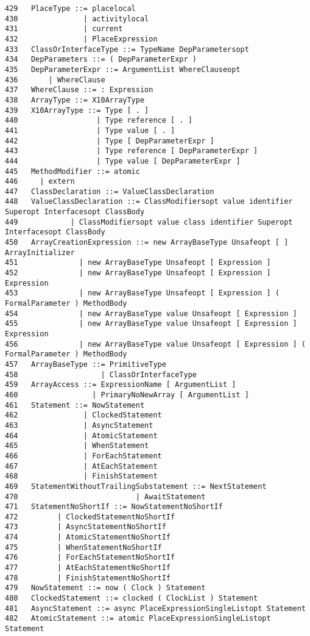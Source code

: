 {\begin{verbatim}
429   PlaceType ::= placelocal
430               | activitylocal
431               | current
432               | PlaceExpression
433   ClassOrInterfaceType ::= TypeName DepParametersopt
434   DepParameters ::= ( DepParameterExpr )
435   DepParameterExpr ::= ArgumentList WhereClauseopt
436       | WhereClause
437   WhereClause ::= : Expression
438   ArrayType ::= X10ArrayType
439   X10ArrayType ::= Type [ . ]
440                  | Type reference [ . ]
441                  | Type value [ . ]
442                  | Type [ DepParameterExpr ]
443                  | Type reference [ DepParameterExpr ]
444                  | Type value [ DepParameterExpr ]
445   MethodModifier ::= atomic
446     | extern
447   ClassDeclaration ::= ValueClassDeclaration
448   ValueClassDeclaration ::= ClassModifiersopt value identifier Superopt Interfacesopt ClassBody
449            | ClassModifiersopt value class identifier Superopt Interfacesopt ClassBody
450   ArrayCreationExpression ::= new ArrayBaseType Unsafeopt [ ] ArrayInitializer
451              | new ArrayBaseType Unsafeopt [ Expression ]
452              | new ArrayBaseType Unsafeopt [ Expression ] Expression
453              | new ArrayBaseType Unsafeopt [ Expression ] ( FormalParameter ) MethodBody
454              | new ArrayBaseType value Unsafeopt [ Expression ]
455              | new ArrayBaseType value Unsafeopt [ Expression ] Expression
456              | new ArrayBaseType value Unsafeopt [ Expression ] ( FormalParameter ) MethodBody
457   ArrayBaseType ::= PrimitiveType
458                   | ClassOrInterfaceType
459   ArrayAccess ::= ExpressionName [ ArgumentList ]
460                 | PrimaryNoNewArray [ ArgumentList ]
461   Statement ::= NowStatement
462               | ClockedStatement
463               | AsyncStatement
464               | AtomicStatement
465               | WhenStatement
466               | ForEachStatement
467               | AtEachStatement
468               | FinishStatement
469   StatementWithoutTrailingSubstatement ::= NextStatement
470                           | AwaitStatement
471   StatementNoShortIf ::= NowStatementNoShortIf
472         | ClockedStatementNoShortIf
473         | AsyncStatementNoShortIf
474         | AtomicStatementNoShortIf
475         | WhenStatementNoShortIf
476         | ForEachStatementNoShortIf
477         | AtEachStatementNoShortIf
478         | FinishStatementNoShortIf
479   NowStatement ::= now ( Clock ) Statement
480   ClockedStatement ::= clocked ( ClockList ) Statement
481   AsyncStatement ::= async PlaceExpressionSingleListopt Statement
482   AtomicStatement ::= atomic PlaceExpressionSingleListopt Statement

\end{verbatim}}
